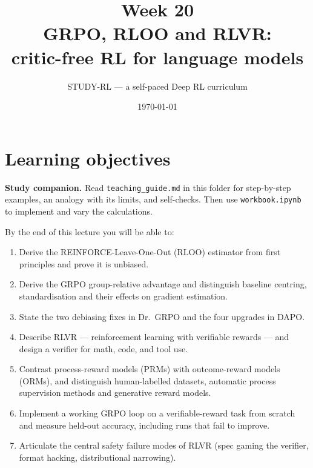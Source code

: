 \documentclass[11pt,oneside]{scrbook}
\title{{\color{rlblue}\textbf{Week 20}\\ \Huge GRPO, RLOO and RLVR:\\ critic-free RL for language models}}
\author{STUDY-RL --- a self-paced Deep RL curriculum}
\date{\today}
\begin{document}
\maketitle
\tableofcontents
\newpage

\chapter*{Learning objectives}


\noindent\textbf{Study companion.} Read \texttt{teaching\_guide.md} in this
folder for step-by-step examples, an analogy with its limits, and self-checks.
Then use \texttt{workbook.ipynb} to implement and vary the calculations.
\par\medskip

\begin{keyidea}
By the end of this lecture you will be able to:
\begin{enumerate}\setlength{\itemsep}{2pt}
  \item Derive the REINFORCE-Leave-One-Out (RLOO) estimator from
        first principles and prove it is unbiased.
  \item Derive the GRPO group-relative advantage and distinguish baseline
        centring, standardisation and their effects on gradient estimation.
  \item State the two debiasing fixes in Dr.~GRPO and the four upgrades in DAPO.
  \item Describe RLVR --- reinforcement learning with verifiable rewards ---
        and design a verifier for math, code, and tool use.
  \item Contrast process-reward models (PRMs) with outcome-reward models
        (ORMs), and distinguish human-labelled datasets, automatic process
        supervision methods and generative reward models.
  \item Implement a working GRPO loop on a verifiable-reward task from
        scratch and measure held-out accuracy, including runs that fail to improve.
  \item Articulate the central safety failure modes of RLVR (spec gaming
        the verifier, format hacking, distributional narrowing).
\end{enumerate}
\end{keyidea}

\end{document}
